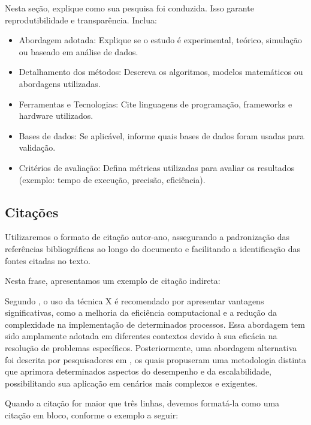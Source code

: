 Nesta seção, explique como sua pesquisa foi conduzida. Isso garante reprodutibilidade e transparência. Inclua:

\begin{itemize}
    \item Abordagem adotada: Explique se o estudo é experimental, teórico, simulação ou baseado em análise de dados.

    \item Detalhamento dos métodos: Descreva os algoritmos, modelos matemáticos ou abordagens utilizadas.

    \item Ferramentas e Tecnologias: Cite linguagens de programação, frameworks e hardware utilizados.

    \item Bases de dados: Se aplicável, informe quais bases de dados foram usadas para validação.

    \item Critérios de avaliação: Defina métricas utilizadas para avaliar os resultados (exemplo: tempo de execução, precisão, eficiência).
\end{itemize}

\subsection{Citações}

    Utilizaremos o formato de citação autor-ano, assegurando a padronização das referências bibliográficas ao longo do documento e facilitando a identificação das fontes citadas no texto.

    Nesta frase, apresentamos um exemplo de citação indireta:

    Segundo \cite{bianchi2021miint}, o uso da técnica X é recomendado por apresentar vantagens significativas, como a melhoria da eficiência computacional e a redução da complexidade na implementação de determinados processos. Essa abordagem tem sido amplamente adotada em diferentes contextos devido à sua eficácia na resolução de problemas específicos. Posteriormente, uma abordagem alternativa foi descrita por pesquisadores em \cite{vadlamudi2023implementing}, os quais propuseram uma metodologia distinta que aprimora determinados aspectos do desempenho e da escalabilidade, possibilitando sua aplicação em cenários mais complexos e exigentes.

    Quando a citação for maior que três linhas, devemos formatá-la como uma citação em bloco, conforme o exemplo a seguir:  

